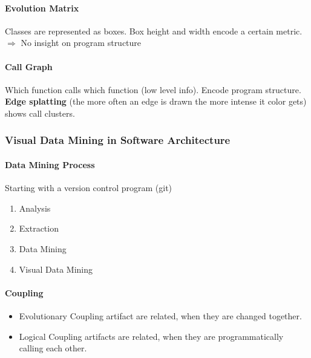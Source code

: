 \documentclass[10pt,a4paper]{article}
\begin{document}
		\paragraph{Evolution Matrix} Classes are represented as boxes. Box height and width encode a certain metric. $ \Rightarrow $ No insight on program structure
		
		\paragraph{Call Graph} Which function calls which function (low level info). Encode program structure. \textbf{Edge splatting} (the more often an edge is drawn the more intense it color gets) shows call clusters.
		
	\subsubsection{Visual Data Mining in Software Architecture}
		\paragraph{Data Mining Process}
		Starting with a version control program (git)
		\begin{enumerate}
			\item Analysis
			\item Extraction
			\item Data Mining
			\item Visual Data Mining
		\end{enumerate} 
		
		
		\paragraph{Coupling}
		\begin{itemize}
			\item Evolutionary Coupling artifact are related, when they are changed together.
			\item Logical Coupling artifacts are related, when they are programmatically calling each other.
		\end{itemize}
			
\end{document}
